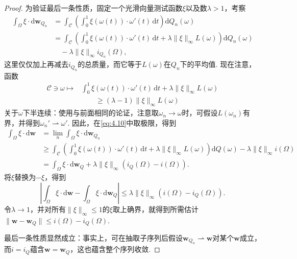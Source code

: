 \begin{proof}
为验证最后一条性质，固定一个光滑向量测试函数$\xi$以及数$\lambda>1$，考察
\begin{equation}\label{eq:4.10}
\begin{aligned}
 \int_\Omega\xi\cdot\mathrm d\mathbf w_{Q_n}
 &=\int_{\mathscr C}\left(\int_0^1\xi(\omega(t))\cdot\omega'(t)\,\mathrm dt\right)\mathrm dQ_n(\omega)\\
 &=\int_{\mathscr C}\left(\int_0^1\xi(\omega(t))\cdot\omega'(t)\,\mathrm dt
                     +\lambda\|\xi\|_\infty L(\omega)\right)\mathrm dQ_n(\omega)\\
 &\quad-\lambda\|\xi\|_\infty i_{Q_n}(\Omega),
\end{aligned}
\end{equation}
这里仅仅加上再减去$i_{Q_n}$的总质量，而它等于$L(\omega)$在$Q_n$下的平均值. 现在注意，函数
\begin{equation*}
\begin{aligned}
 \mathscr C\ni\omega\mapsto&\int_0^1\xi(\omega(t))\cdot\omega'(t)\,\mathrm dt
                     +\lambda\|\xi\|_\infty L(\omega)\\
 &\qquad\geq(\lambda-1)\|\xi\|_\infty L(\omega)
\end{aligned}
\end{equation*}
关于$\omega$下半连续：使用与前面相同的论证，注意取$\omega_n\to\omega$时，可假设$L(\omega_n)$有界，并得到$\omega_n'\rightharpoonup\omega'$. 因此，在\eqref{eq:4.10}中取极限，得到
\begin{equation*}
\begin{aligned}
 \int_\Omega\xi\cdot\mathrm d\mathbf w
 &=\lim_n\int_\Omega\xi\cdot\mathrm d\mathbf w_{Q_n}\\
 &\geq\int_{\mathscr C}\left(\int_0^1\xi(\omega(t))\cdot\omega'(t)\,\mathrm dt
              +\lambda\|\xi\|_\infty L(\omega)\right)\mathrm dQ(\omega)
              -\lambda\|\xi\|_\infty i(\Omega)\\
 &=\int_\Omega\xi\cdot\mathrm d\mathbf w_Q
               +\lambda\|\xi\|_\infty(i_Q(\Omega)-i(\Omega)).
\end{aligned}
\end{equation*}
将$\xi$替换为$-\xi$，得到
\[
 \left|\int_\Omega\xi\cdot\mathrm d\mathbf w
             -\int_\Omega\xi\cdot\mathrm d\mathbf w_Q\right|
 \leq\lambda\|\xi\|_\infty(i(\Omega)-i_Q(\Omega)).
\]
令$\lambda\to1$，并对所有$\|\xi\|_\infty\leq1$的$\xi$取上确界，就得到所需估计$\|\mathbf w-\mathbf w_Q\|\leq i(\Omega)-i_Q(\Omega)$.

最后一条性质显然成立：事实上，可在抽取子序列后假设$\mathbf w_{Q_n}\rightharpoonup\mathbf w$对某个$\mathbf w$成立，而$i=i_Q$蕴含$\mathbf w=\mathbf w_Q$，这也蕴含整个序列收敛.
\end{proof}

